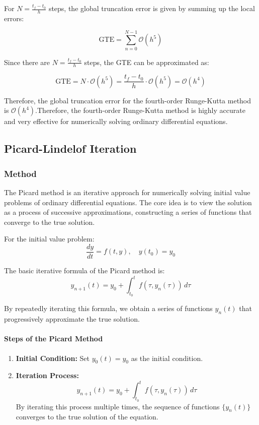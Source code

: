 \documentclass{article}
\begin{document}
For \( N = \frac{t_f - t_0}{h} \) steps, the global truncation error is given by summing up the local errors:

\[
\text{GTE} = \sum_{n=0}^{N-1} \mathcal{O}(h^5)
\]

Since there are \( N = \frac{t_f - t_0}{h} \) steps, the GTE can be approximated as:

\[
\text{GTE} = N \cdot \mathcal{O}(h^5) = \frac{t_f - t_0}{h} \cdot \mathcal{O}(h^5) = \mathcal{O}(h^4)
\]

Therefore, the global truncation error for the fourth-order Runge-Kutta method is \( \mathcal{O}(h^4) \).Therefore, the fourth-order Runge-Kutta method is highly accurate and very effective for numerically solving ordinary differential equations.


\subsection{Picard-Lindelof Iteration}

\subsubsection{Method}

The Picard method is an iterative approach for numerically solving initial value problems of ordinary differential equations. The core idea is to view the solution as a process of successive approximations, constructing a series of functions that converge to the true solution.

For the initial value problem:
\[
\frac{dy}{dt} = f(t, y), \quad y(t_0) = y_0
\]

The basic iterative formula of the Picard method is:
\[
y_{n+1}(t) = y_0 + \int_{t_0}^{t} f(\tau, y_n(\tau)) \, d\tau
\]

By repeatedly iterating this formula, we obtain a series of functions \( y_n(t) \) that progressively approximate the true solution.

\paragraph{Steps of the Picard Method}
\begin{enumerate}
    \item \textbf{Initial Condition:} Set \( y_0(t) = y_0 \) as the initial condition.
    \item \textbf{Iteration Process:}
    \[
    y_{n+1}(t) = y_0 + \int_{t_0}^{t} f(\tau, y_n(\tau)) \, d\tau
    \]
    By iterating this process multiple times, the sequence of functions \( \{y_n(t)\} \) converges to the true solution of the equation.
\end{enumerate}
\end{document}
